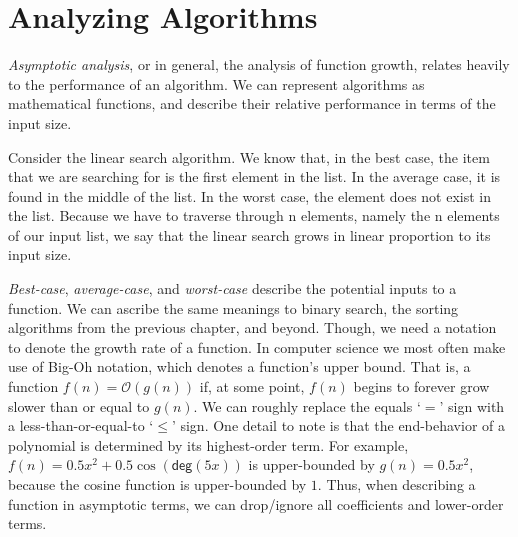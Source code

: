 \section{Analyzing Algorithms}

\textit{Asymptotic analysis}, or in general, the analysis of function growth, relates heavily to the performance of an algorithm. We can represent algorithms as mathematical functions, and describe their relative performance in terms of the input size. 

\example Consider the linear search algorithm. We know that, in the best case, the item that we are searching for is the first element in the list. In the average case, it is found in the middle of the list. In the worst case, the element does not exist in the list. Because we have to traverse through n elements, namely the n elements of our input list, we say that the linear search grows in linear proportion to its input size. 

\textit{Best-case}, \textit{average-case}, and \textit{worst-case} describe the potential inputs to a function. We can ascribe the same meanings to binary search, the sorting algorithms from the previous chapter, and beyond. Though, we need a notation to denote the growth rate of a function. In computer science we most often make use of Big-Oh notation, which denotes a function's upper bound. That is, a function $f(n) = \mathcal{O}(g(n))$ if, at some point, $f(n)$ begins to forever grow slower than or equal to $g(n)$. We can roughly replace the equals `$=$' sign with a less-than-or-equal-to `$\leq$' sign. One detail to note is that the end-behavior of a polynomial is determined by its highest-order term. For example, $f(n) = 0.5x^2 + 0.5\cos(\textsf{deg}(5x))$ is upper-bounded by $g(n) = 0.5x^2$, because the cosine function is upper-bounded by $1$. Thus, when describing a function in asymptotic terms, we can drop/ignore all coefficients and lower-order terms.

